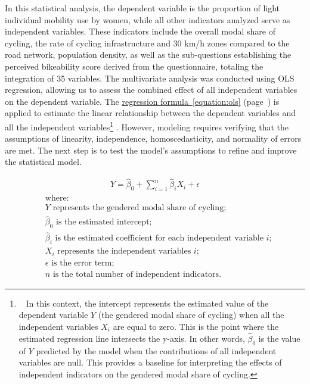 \begin{refsegment}
In this statistical analysis, the dependent variable is the proportion of light individual mobility use by women, while all other indicators analyzed serve as independent variables. These indicators include the overall modal share of cycling, the rate of cycling infrastructure and 30 km/h zones compared to the road network, population density, as well as the sub-questions establishing the perceived bikeability score derived from the questionnaire, totaling the integration of 35 variables. The multivariate analysis was conducted using \acrshort{OLS} regression, allowing us to assess the combined effect of all independent variables on the dependent variable. The \hyperref[equation:ols]{regression formula~\ref{equation:ols}} (page~\pageref{equation:ols}) is applied to estimate the linear relationship between the dependent variables and all the independent variables\footnote{~
    In this context, the intercept represents the estimated value of the dependent variable \(Y\) (the gendered modal share of cycling) when all the independent variables \(X_i\) are equal to zero. This is the point where the estimated regression line intersects the y-axis. In other words, \(\hat{\beta}_0\) is the value of \(Y\) predicted by the model when the contributions of all independent variables are null. This provides a baseline for interpreting the effects of independent indicators on the gendered modal share of cycling.
} \textcolor{blue}{\autocite{strang_introduction_1986}}. However, modeling requires verifying that the assumptions of linearity, independence, homoscedasticity, and normality of errors are met. The next step is to test the model's assumptions to refine and improve the statistical model. %

\begin{equation}
\label{equation:ols}
\begin{aligned}
Y = \hat{\beta}_0 + \sum_{i=1}^{n} \hat{\beta}_i X_i + \epsilon
\end{aligned}
\end{equation}
\begin{align*}
    &\text{where:} \\
    &Y \text{ represents the gendered modal share of cycling;} \\
    &\hat{\beta}_0 \text{ is the estimated intercept;} \\
    &\hat{\beta}_i \text{ is the estimated coefficient for each independent variable } i\text{;}\\
    &X_i \text{ represents the independent variables } i\text{;}\\
    &\epsilon \text{ is the error term;} \\
    &n \text{ is the total number of independent indicators.}
\end{align*} %


\end{refsegment}
